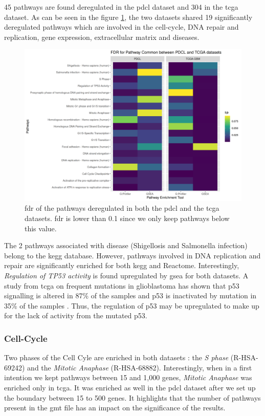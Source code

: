 45 pathways are found deregulated in the \acrshort{pdcl} dataset and 304 in the \acrshort{tcga} dataset.
As can be seen in the figure \ref{fig:heatmap-fdr-global-tcga}, the two datasets shared 19 significantly deregulated pathways which are involved in the cell-cycle, DNA repair and replication, gene expression, extracellular matrix and diseases.
\begin{figure}
    \includegraphics[width=\textwidth]{img/heatmap-fdr-global-tcga}
    \caption{
        \acrfull{fdr} of the pathways deregulated in both the \acrshort{pdcl} and the \acrshort{tcga} datasets.
        \acrshort{fdr} is lower than 0.1 since we only keep pathways below this value.
    }
    \label{fig:heatmap-fdr-global-tcga}
\end{figure}
The 2 pathways associated with disease (Shigellosis and Salmonella infection) belong to the \acrshort{kegg} database.
However, pathways involved in DNA replication and repair are significantly enriched for both \acrshort{kegg} and Reactome.
Interestingly, \textit{Regulation of TP53 activity} is found upregulated by \acrshort{gsea} for both datasets.
A study from \acrshort{tcga} on frequent mutations in glioblastoma has shown that p53 signalling is altered in 87\% of the samples and p53 is inactivated by mutation in 35\% of the samples \cite*{McLendon2008}.
Thus, the regulation of p53 may be upregulated to make up for the lack of activity from the mutated p53.

\subsubsection{Cell-Cycle}

Two phases of the Cell Cyle are enriched in both datasets : the \textit{S phase} (R-HSA-69242) and the \textit{Mitotic Anaphase} (R-HSA-68882).
Interestingly, when in a first intention we kept pathways between 15 and 1,000 genes, \textit{Mitotic Anaphase}  was enriched only in \acrshort{tcga}.
It was enriched as well in the \acrshort{pdcl} dataset after we set up the boundary between 15 to 500 genes.
It highlights that the number of pathways present in the \acrshort{gmt} file has an impact on the significance of the results.


